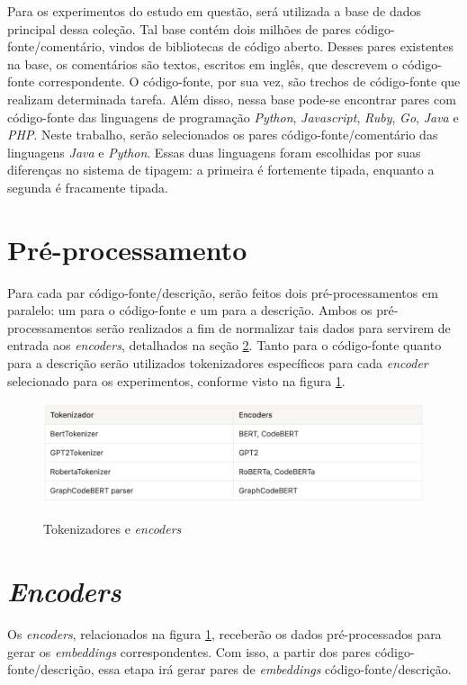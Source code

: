 Para os experimentos do estudo em questão, será utilizada a base de dados principal dessa coleção. Tal base contém dois milhões de pares código-fonte/comentário, vindos de bibliotecas de código aberto. Desses pares existentes na base, os comentários são textos, escritos em inglês, que descrevem o código-fonte correspondente. O código-fonte, por sua vez, são trechos de código-fonte que realizam determinada tarefa. Além disso, nessa base pode-se encontrar pares com código-fonte das linguagens de programação \textit{Python}, \textit{Javascript}, \textit{Ruby}, \textit{Go}, \textit{Java} e \textit{PHP}. Neste trabalho, serão selecionados os pares código-fonte/comentário das linguagens \textit{Java} e \textit{Python}. Essas duas linguagens foram escolhidas por suas diferenças no sistema de tipagem: a primeira é fortemente tipada, enquanto a segunda é fracamente tipada. 

\section{Pré-processamento}
\label{sec:methodology:pre-processing}
Para cada par código-fonte/descrição, serão feitos dois pré-processamentos em paralelo: um para o código-fonte e um para a descrição. Ambos os pré-processamentos serão realizados a fim de normalizar tais dados para servirem de entrada aos \textit{encoders}, detalhados na seção \ref{sec:methodology:encoders}. Tanto para o código-fonte quanto para a descrição serão utilizados tokenizadores específicos para cada \textit{encoder} selecionado para os experimentos, conforme visto na figura \ref{fig:metodology-tokenizers}.

\begin{figure}[htbp]
    \centering
        \caption{Tokenizadores e \textit{encoders}}
        \includegraphics[scale=0.5]{tokenizers.png}
        \label{fig:metodology-tokenizers}
\end{figure}

\section{\textit{Encoders}}
\label{sec:methodology:encoders}
Os \textit{encoders}, relacionados na figura \ref{fig:metodology-tokenizers}, receberão os dados pré-processados para gerar os \textit{embeddings} correspondentes. Com isso, a partir dos pares código-fonte/descrição, essa etapa irá gerar pares de \textit{embeddings} código-fonte/descrição.

